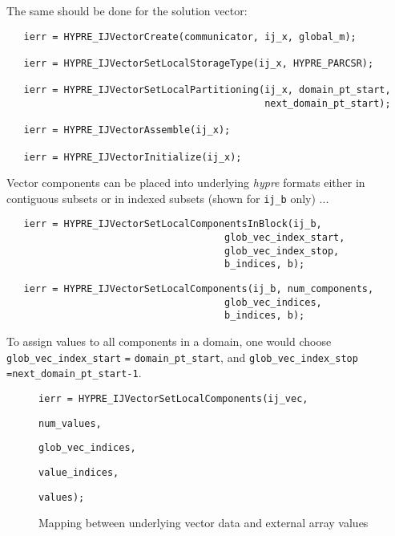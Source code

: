 \noindent The same should be done for the solution vector:

\begin{verbatim}
   ierr = HYPRE_IJVectorCreate(communicator, ij_x, global_m);

   ierr = HYPRE_IJVectorSetLocalStorageType(ij_x, HYPRE_PARCSR);

   ierr = HYPRE_IJVectorSetLocalPartitioning(ij_x, domain_pt_start,
                                             next_domain_pt_start);

   ierr = HYPRE_IJVectorAssemble(ij_x);

   ierr = HYPRE_IJVectorInitialize(ij_x);
\end{verbatim}

\noindent Vector components can be placed into underlying
{\slshape hypre} formats either in contiguous subsets or in
indexed subsets (shown for \verb+ij_b+ only) ...

\begin{verbatim}
   ierr = HYPRE_IJVectorSetLocalComponentsInBlock(ij_b,
                                      glob_vec_index_start,
                                      glob_vec_index_stop,
                                      b_indices, b);
\end{verbatim}
\begin{verbatim}
   ierr = HYPRE_IJVectorSetLocalComponents(ij_b, num_components,
                                      glob_vec_indices,
                                      b_indices, b);
\end{verbatim}

\noindent To assign values to all components in a domain, one would
choose \verb+glob_vec_index_start+ \verb+=+ \verb+domain_pt_start+,
and \verb+glob_vec_index_stop+ \verb+=+\verb+next_domain_pt_start-1+.

\begin{figure}[b]
\label{loc_comps_map}
\centerline{}
\parbox{6in}{\hspace{1in}
             {\tt ierr = HYPRE\_IJVectorSetLocalComponents(ij\_vec,}}
\parbox{6in}{\hspace{4.15in}
             {\tt num\_values,}}
\parbox{6in}{\hspace{4.15in}
             {\tt glob\_vec\_indices,}}
\parbox{6in}{\hspace{4.15in}
             {\tt value\_indices,}}
\parbox{6in}{\hspace{4.15in}
             {\tt values);}}
\caption{Mapping between underlying vector data and external
    array values}
\end{figure}

